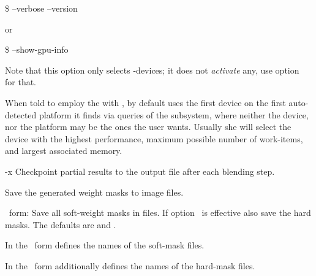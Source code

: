 \begin{codelist}
  \begin{terminal}
    \$ \app{} --verbose --version
  \end{terminal}
  or
  \begin{terminal}
    \$ \app{} --show-gpu-info
  \end{terminal}

  Note that this option only selects -devices; it does not \emph{activate} any, use
  option~ for that.

  When told to employ the  with , by default \App{} uses the first
  device on the first auto-detected platform it finds via queries of the 
  subsystem, where neither the device, nor the platform may be the ones the user wants.  Usually
  she will select the device with the highest performance, maximum possible number of
  work-items, and largest associated memory.


\ifenblend
    \label{opt:x}%
  \item[-x]
    Checkpoint partial results to the output file after each blending step.
\fi


\ifenfuse
    \label{opt:save-masks}%
  \item[\itempar{--save-masks~\textrm{(\oldstylefirst~form)}
      \\ --save-masks=\metavar{SOFT-MASK-TEMPLATE}~\textrm{(\oldstylesecond~form)}
      \\ --save-masks=\metavar{SOFT-MASK-TEMPLATE}:\feasiblebreak
      \metavar{HARD-MASK-TEMPLATE}~\textrm{(\oldstylethird~form)}}]\itemend
    Save the generated weight masks to image files.

    \begin{sloppypar}
      \oldstylefirst~form: Save all soft-weight masks in files.  If
      option~ is effective also save the hard
      masks.  The defaults are  and
      .

      In the \oldstylesecond~form  defines the names of
      the soft-mask files.

      In the \oldstylethird~form  additionally defines the
      names of the hard-mask files.
    \end{sloppypar}


\end{codelist}
